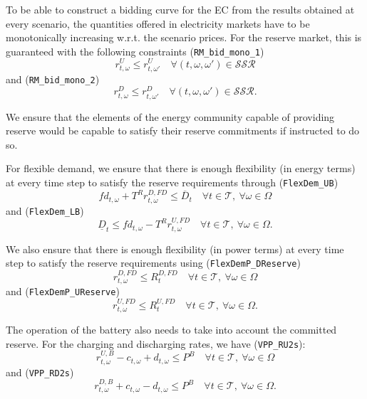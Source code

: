 \documentclass{article}
\begin{document}
To be able to construct a bidding curve for the EC from the results obtained at every scenario, the quantities offered in electricity markets have to be monotonically increasing w.r.t. the scenario prices. For the reserve market, this is guaranteed with the following constraints (\verb|RM_bid_mono_1|)
\begin{equation} \label{EQ:RUmono}
	r^{U}_{t, \omega} \leq r^{U}_{t, \omega'} \quad \forall (t, \omega, \omega') \in \mathcal{SSR}
\end{equation}
and (\verb|RM_bid_mono_2|)
\begin{equation} \label{EQ:RDmono}
	r^{D}_{t, \omega} \leq r^{D}_{t, \omega'} \quad \forall (t, \omega, \omega') \in \mathcal{SSR}.
\end{equation}

We ensure that the elements of the energy community capable of providing reserve would be capable to satisfy their reserve commitments if instructed to do so. 

For flexible demand, we ensure that there is enough flexibility (in energy terms) at every time step to satisfy the reserve requirements through (\verb|FlexDem_UB|)
\begin{equation} \label{EQ:FlexDemand_UB}
	fd_{t, \omega} + T^R r^{D, FD}_{t, \omega} \leq \overline{D}_t \quad \forall t \in \mathcal{T}, \ \forall \omega \in \Omega
\end{equation}
and (\verb|FlexDem_LB|)
\begin{equation} \label{EQ:FlexDemand_LB}
	\underline{D}_t \leq fd_{t, \omega} - T^R r^{U, FD}_{t, \omega} \quad \forall t \in \mathcal{T}, \ \forall \omega \in \Omega.
\end{equation}

We also ensure that there is enough flexibility (in power terms) at every time step to satisfy the reserve requirements using (\verb|FlexDemP_DReserve|)
\begin{equation} \label{EQ:FlexDemP_DReserve}
	r^{D, FD}_{t, \omega} \leq R^{D, FD}_t \quad \forall t \in \mathcal{T}, \ \forall \omega \in \Omega
\end{equation}
and (\verb|FlexDemP_UReserve|)
\begin{equation} \label{EQ:FlexDemP_UReserve}
	r^{U, FD}_{t, \omega} \leq R^{U, FD}_t \quad \forall t \in \mathcal{T}, \ \forall \omega \in \Omega.
\end{equation}

The operation of the battery also needs to take into account the committed reserve. For the charging and discharging rates, we have (\verb|VPP_RU2s|):
\begin{equation} \label{EQ:VPP_RU2s}
	r^{U, B} _{t, \omega} - c_{t, \omega} + d_{t, \omega}  \leq P^B \quad \forall t \in \mathcal{T}, \ \forall \omega \in \Omega
\end{equation}
and (\verb|VPP_RD2s|)
\begin{equation} \label{EQ:VPP_RD2s}
	r^{D, B}_{t, \omega} + c_{t, \omega} - d_{t, \omega} \leq P^B \quad \forall t \in \mathcal{T}, \ \forall \omega \in \Omega.
\end{equation}
\end{document}
